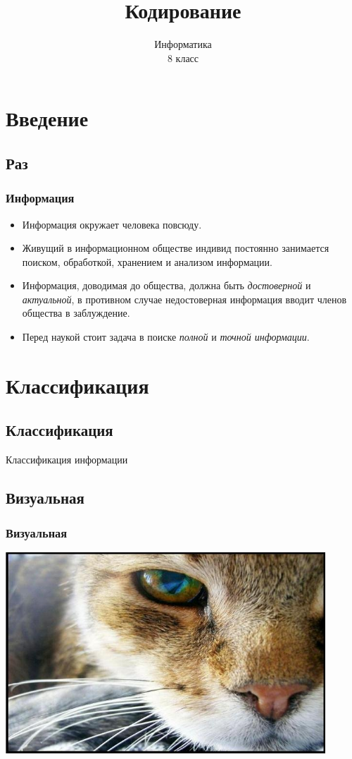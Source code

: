 \documentclass[compress,red]{beamer}
\title{Кодирование}
\author{Информатика \\ 8 класс}
\begin{document}
\maketitle

\section{Введение}
\subsection{Раз}
\begin{frame}
  \frametitle{Информация}
  \begin{itemize}
    \item Информация окружает человека повсюду.
    \item Живущий в информационном обществе индивид постоянно занимается поиском, обработкой, хранением и анализом информации.
    \item Информация, доводимая до общества, должна быть \emph{достоверной} и \emph{актуальной}, в противном случае недостоверная информация вводит членов общества в заблуждение.
    \item Перед наукой стоит задача в поиске \emph{полной} и \emph{точной информации}.
  \end{itemize}
\end{frame}

\section{Классификация}
\subsection{Классификация}
\begin{frame}
  \begin{center}
    \Huge{Классификация информации}
  \end{center}
\end{frame}

\subsection{Визуальная}
\begin{frame}[fragile]
  \frametitle{Визуальная}
  \centerline{\includegraphics[width=0.9\textwidth]{images/cat_eye.png}}
\end{frame}
\end{document}
